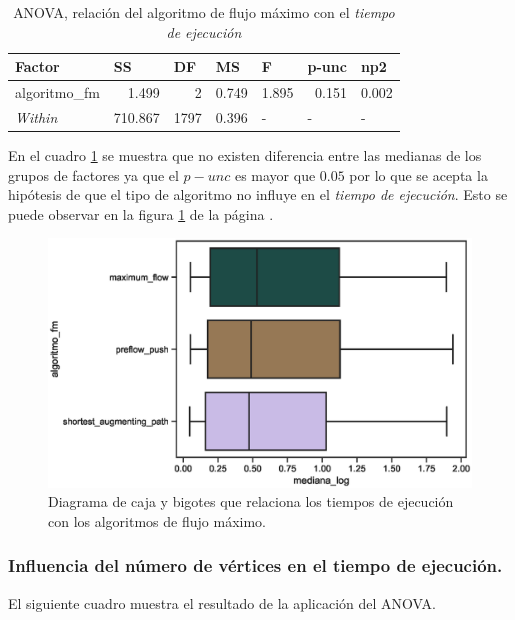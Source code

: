 \documentclass{article}
\begin{document}
\begin{table}[htbp]
  \centering
  \caption{ANOVA, relación del algoritmo de flujo máximo con el \textit{tiempo de ejecución}}
    \begin{tabular}{lrrrlll}
    \toprule
    \textbf{Factor} & \multicolumn{1}{l}{\textbf{SS}} & \multicolumn{1}{l}{\textbf{DF}} & \multicolumn{1}{l}{\textbf{MS}} & \textbf{F} & \textbf{p-unc} & \textbf{np2} \\
    \midrule
    algoritmo\_fm & 1.499 & 2     & 0.749 & \multicolumn{1}{r}{1.895} & \multicolumn{1}{r}{0.151} & \multicolumn{1}{r}{0.002} \\
    \textit{Within} & 710.867 & 1797  & 0.396 & -     & -     & - \\
    \bottomrule
    \end{tabular}%
  \label{tab:t3}%
\end{table}%
En el cuadro \ref{tab:t3} se muestra que no existen diferencia entre las medianas de los grupos de factores ya que el $p-unc$ es mayor que $0.05$ por lo que se acepta la hipótesis de que el tipo de algoritmo no influye en el \textit{tiempo de ejecución}. Esto se puede observar en la figura \ref{fig5} de la página \pageref{fig5}. 
\begin{center}
\begin{figure}[htbp]
\includegraphics[scale=0.6]{boxplotalgoritmofm.eps}
\caption{Diagrama de caja y bigotes que relaciona los tiempos de ejecución con los algoritmos de flujo máximo.}
\label{fig5}
\end{figure}
\end{center}
\newpage

\subsubsection{Influencia del número de vértices en el tiempo de ejecución.}
El siguiente cuadro muestra el resultado de la aplicación del ANOVA.
\end{document}
